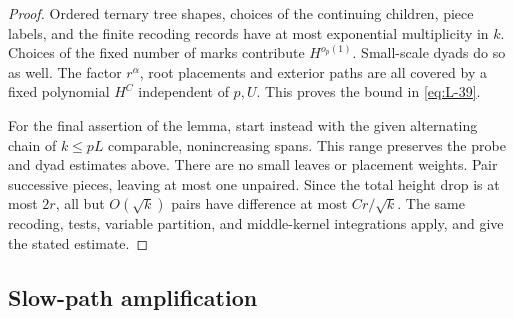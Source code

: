 \begin{proof}
Ordered ternary tree shapes, choices of the continuing children,
piece labels, and the finite recoding records have at most
exponential multiplicity in $k$. Choices of the fixed number of
marks contribute $H^{o_p(1)}$. Small-scale dyads do so as well. The
factor $r^\alpha$, root placements and exterior paths are all covered
by a fixed polynomial $H^C$ independent of $p,U$. This proves the bound in \eqref{eq:L-39}.

For the final assertion of the lemma, start instead with the given
alternating chain of $k\le pL$ comparable, nonincreasing spans. This
range preserves the probe and dyad estimates above. There are no
small leaves or placement weights. Pair successive pieces, leaving
at most one unpaired. Since the total height drop is at most $2r$,
all but $O(\sqrt{k})$ pairs have difference at most $Cr/\sqrt{k}$.
The same recoding, tests, variable partition, and middle-kernel
integrations apply, and give the stated estimate.
\end{proof}

\subsection{Slow-path amplification}

